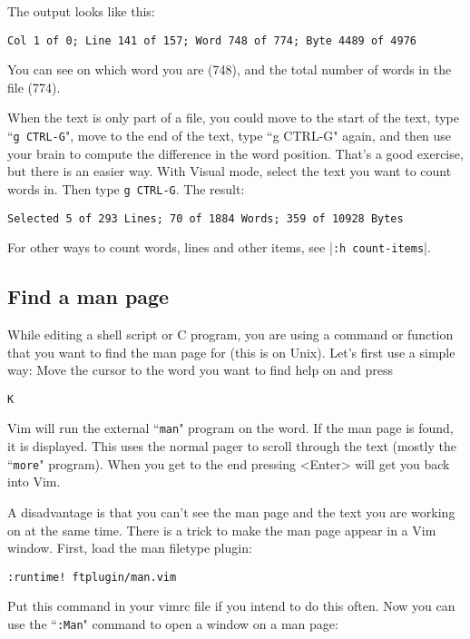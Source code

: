 The output looks like this:

\begin{Verbatim}[samepage=true]
    Col 1 of 0; Line 141 of 157; Word 748 of 774; Byte 4489 of 4976 
\end{Verbatim}

You can see on which word you are (748), and the total number of words in the file (774).

When the text is only part of a file, you could move to the start of the text, type ``\texttt{g CTRL-G}", move to the end of the text, type ``g CTRL-G" again, and then use your brain to compute the difference in the word position.
That's a good exercise, but there is an easier way.
With Visual mode, select the text you want to count words in.
Then type \texttt{g CTRL-G}.
The result:

\begin{Verbatim}[samepage=true]
    Selected 5 of 293 Lines; 70 of 1884 Words; 359 of 10928 Bytes 
\end{Verbatim}

For other ways to count words, lines and other items, see |\texttt{:h count-items}|.
\subsection{Find a man page}
\label{find-manpage}
While editing a shell script or C program, you are using a command or function that you want to find the man page for (this is on Unix).
Let's first use a simple way: Move the cursor to the word you want to find help on and press

\begin{Verbatim}[samepage=true]
 K
\end{Verbatim}

Vim will run the external ``\texttt{man}" program on the word.
If the man page is found, it is displayed.
This uses the normal pager to scroll through the text (mostly the ``\texttt{more}" program).
When you get to the end pressing <Enter> will get you back into Vim.

A disadvantage is that you can't see the man page and the text you are working on at the same time.
There is a trick to make the man page appear in a Vim window.
First, load the man filetype plugin:

\begin{Verbatim}[samepage=true]
 :runtime! ftplugin/man.vim
\end{Verbatim}

Put this command in your vimrc file if you intend to do this often.
Now you can use the ``\texttt{:Man}" command to open a window on a man page:

